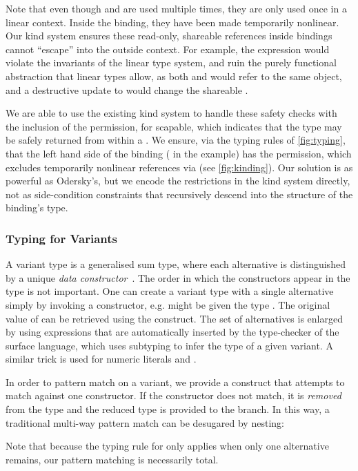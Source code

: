 \documentclass[9pt\ifFinal\else,preprint,nocopyrightspace\fi,\ifAlpha\else natbib,authoryear\fi]{sigplanconf}
\begin{document}
Note that even though  and  are used multiple times, they are only used once in a linear context. Inside the  binding, they have been made
temporarily nonlinear. Our kind system ensures these read-only, shareable references inside  bindings cannot ``escape'' into
the outside context. For example, the expression  would violate the invariants of the linear type system, and ruin the purely
functional abstraction that linear types allow, as both  and  would refer to the same object, and a destructive update to  would change the shareable . 

We are able to use the existing kind system to handle these safety checks with
the inclusion of the  permission, for
scapable, which indicates that the type may be safely returned
from within a . We ensure, via the typing rules of
\autoref{fig:typing}, that the left hand side of the binding ( in the example) has the
 permission, which excludes temporarily nonlinear references via
 (see \autoref{fig:kinding}). Our solution is as powerful as
Odersky's, but we encode the restrictions in the kind system directly, not as 
side-condition constraints that recursively descend into the structure of
the binding's type.




\subsubsection{Typing for Variants}\label{s:variants}
A variant type  is a generalised sum type, where each alternative is distinguished by a unique \emph{data constructor}~. The order in which the constructors appear in the type is not important.
One can create a variant type with a single alternative simply by invoking a constructor, e.g.  might be given the type
. The original value of  can be retrieved using the  construct. The set of alternatives is enlarged 
by using  expressions that are automatically inserted by the type-checker of the surface language, which uses subtyping to infer the type of a given
variant. A similar trick is used for numeric literals and . 

In order to pattern match on a variant, we provide a  construct that attempts to match against one constructor. If the constructor does not match, 
it is \emph{removed} from the type and the reduced type is provided to the  branch. In this way, a traditional multi-way pattern match can be desugared
by nesting:

Note that because the typing rule for  only applies when only one alternative remains, our pattern matching is necessarily total.
\end{document}
